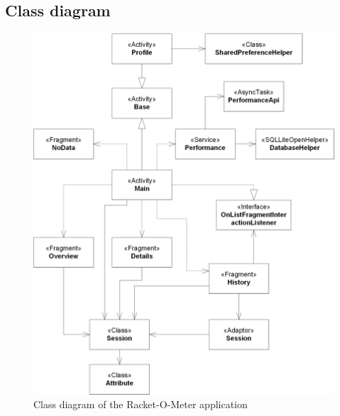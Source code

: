 \begin{appendices}

\chapter{Class diagram}

\begin{figure}[h] \centering
	\includegraphics[width=1\textwidth]{graphics/class}
	\caption{Class diagram of the Racket-O-Meter application}
\end{figure} 

\end{appendices}
